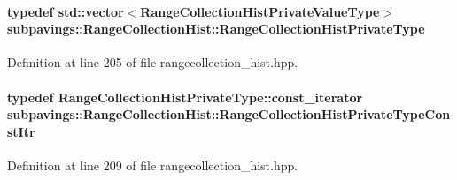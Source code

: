 \hypertarget{classsubpavings_1_1RangeCollectionHist_ab3b0321ac69a063bda1c70cdb9bf00ec}{
\paragraph[{\-Range\-Collection\-Hist\-Private\-Type}]{\setlength{\rightskip}{0pt plus 5cm}typedef std\-::vector$<${\bf \-Range\-Collection\-Hist\-Private\-Value\-Type}$>$ {\bf subpavings\-::\-Range\-Collection\-Hist\-::\-Range\-Collection\-Hist\-Private\-Type}}}\label{classsubpavings_1_1RangeCollectionHist_ab3b0321ac69a063bda1c70cdb9bf00ec}


\-Definition at line 205 of file rangecollection\-\_\-hist.\-hpp.

\hypertarget{classsubpavings_1_1RangeCollectionHist_acb2f5e2dbcc99b2efcb6bb62f010574e}{
\paragraph[{\-Range\-Collection\-Hist\-Private\-Type\-Const\-Itr}]{\setlength{\rightskip}{0pt plus 5cm}typedef \-Range\-Collection\-Hist\-Private\-Type\-::const\-\_\-iterator {\bf subpavings\-::\-Range\-Collection\-Hist\-::\-Range\-Collection\-Hist\-Private\-Type\-Const\-Itr}}}\label{classsubpavings_1_1RangeCollectionHist_acb2f5e2dbcc99b2efcb6bb62f010574e}


\-Definition at line 209 of file rangecollection\-\_\-hist.\-hpp.

